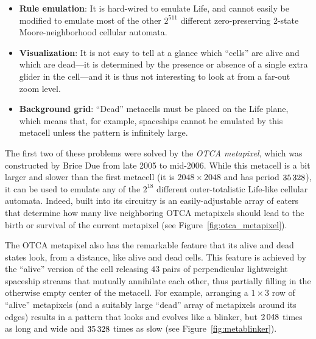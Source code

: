 \begin{itemize}
	\item \textbf{Rule emulation}: It is hard-wired to emulate Life, and cannot easily be modified to emulate most of the other $2^{511}$ different zero-preserving 2-state Moore-neighborhood cellular automata.\smallskip
	
	\item \textbf{Visualization}: It is not easy to tell at a glance which ``cells'' are alive and which are dead---it is determined by the presence or absence of a single extra glider in the cell---and it is thus not interesting to look at from a far-out zoom level.\smallskip
	
	\item \textbf{Background grid}: ``Dead'' metacells must be placed on the Life plane, which means that, for example, spaceships cannot be emulated by this metacell unless the pattern is infinitely large.\smallskip
\end{itemize}

The first two of these problems were solved by the \emph{OTCA metapixel}, which was constructed by Brice Due from late 2005 to mid-2006. While this metacell is a bit larger and slower than the first metacell (it is $2048 \times 2048$ and has period $35{\,}328$), it can be used to emulate any of the $2^{18}$ different outer-totalistic Life-like cellular automata. Indeed, built into its circuitry is an easily-adjustable array of eaters that determine how many live neighboring OTCA metapixels should lead to the birth or survival of the current metapixel (see Figure~\ref{fig:otca_metapixel}). 


The OTCA metapixel also has the remarkable feature that its alive and dead states look, from a distance, like alive and dead cells. This feature is achieved by the ``alive'' version of the cell releasing $43$ pairs of perpendicular lightweight spaceship streams that mutually annihilate each other, thus partially filling in the otherwise empty center of the metacell. For example, arranging a $1 \times 3$ row of ``alive'' metapixels (and a suitably large ``dead'' array of metapixels around its edges) results in a pattern that looks and evolves like a blinker, but $2{\,}048$ times as long and wide and $35{\,}328$ times as slow (see Figure~\ref{fig:metablinker}).

